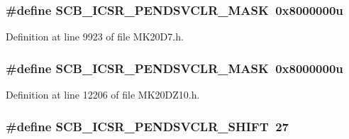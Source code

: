 \subsubsection[{\texorpdfstring{S\+C\+B\+\_\+\+I\+C\+S\+R\+\_\+\+P\+E\+N\+D\+S\+V\+C\+L\+R\+\_\+\+M\+A\+SK}{SCB_ICSR_PENDSVCLR_MASK}}]{\setlength{\rightskip}{0pt plus 5cm}\#define S\+C\+B\+\_\+\+I\+C\+S\+R\+\_\+\+P\+E\+N\+D\+S\+V\+C\+L\+R\+\_\+\+M\+A\+SK~0x8000000u}\hypertarget{group___s_c_b___register___masks_ga12a45a6af09cbefd431d033d8411220e}{}\label{group___s_c_b___register___masks_ga12a45a6af09cbefd431d033d8411220e}


Definition at line 9923 of file M\+K20\+D7.\+h.

\subsubsection[{\texorpdfstring{S\+C\+B\+\_\+\+I\+C\+S\+R\+\_\+\+P\+E\+N\+D\+S\+V\+C\+L\+R\+\_\+\+M\+A\+SK}{SCB_ICSR_PENDSVCLR_MASK}}]{\setlength{\rightskip}{0pt plus 5cm}\#define S\+C\+B\+\_\+\+I\+C\+S\+R\+\_\+\+P\+E\+N\+D\+S\+V\+C\+L\+R\+\_\+\+M\+A\+SK~0x8000000u}\hypertarget{group___s_c_b___register___masks_ga12a45a6af09cbefd431d033d8411220e}{}\label{group___s_c_b___register___masks_ga12a45a6af09cbefd431d033d8411220e}


Definition at line 12206 of file M\+K20\+D\+Z10.\+h.

\subsubsection[{\texorpdfstring{S\+C\+B\+\_\+\+I\+C\+S\+R\+\_\+\+P\+E\+N\+D\+S\+V\+C\+L\+R\+\_\+\+S\+H\+I\+FT}{SCB_ICSR_PENDSVCLR_SHIFT}}]{\setlength{\rightskip}{0pt plus 5cm}\#define S\+C\+B\+\_\+\+I\+C\+S\+R\+\_\+\+P\+E\+N\+D\+S\+V\+C\+L\+R\+\_\+\+S\+H\+I\+FT~27}\hypertarget{group___s_c_b___register___masks_gad7a5894ad98606b443ab6f1b52f2bc36}{}\label{group___s_c_b___register___masks_gad7a5894ad98606b443ab6f1b52f2bc36}


